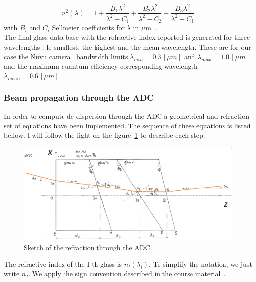 \begin{equation}
	n^2(\lambda) = 1+ \frac{B_1\lambda^2}{\lambda^2-C_1}+\frac{B_2\lambda^2}{\lambda^2-C_2}+\frac{B_3\lambda^2}{\lambda^2-C_3}\label{eq:Sellmeier}
\end{equation}
with $B_i$ and $C_i$ Sellmeier coefficients for $\lambda$ in $\mu$m~\cite{SchottSellmeier}.\\

The final glass data base with the refractive index reported is generated for three wavelengths : le smallest, the highest and the mean wavelength. These are for our case the Nuvu camera~\cite{NuvuQE} bandwidth limits $\lambda_{min} = 0.3\,[\mu m]$ and $\lambda_{max} = 1.0\,[\mu m]$ and the maximum quantum efficiency corresponding wavelength $\lambda_{mean} = 0.6\,[\mu m]$.














\subsubsection{Beam propagation through the ADC}
In order to compute de dispersion through the ADC a geometrical and refraction set of equations have been implemented. The sequence of these equations is listed bellow. I will follow the light on the figure~\ref{fig:ADCgeometrie} to describe each step.
\begin{figure}[H]
\centering
	\includegraphics[width = \textwidth]{images/ADCgeometrie.png}
	\caption{Sketch of the refraction through the ADC}\label{fig:ADCgeometrie}
	\centering
\end{figure}
The refractive index of the I-th glass is $n_I(\lambda_i)$. To simplify the notation, we just write $n_I$.
We apply the sign convention described in the course material~\cite{coursOptLJT}.
